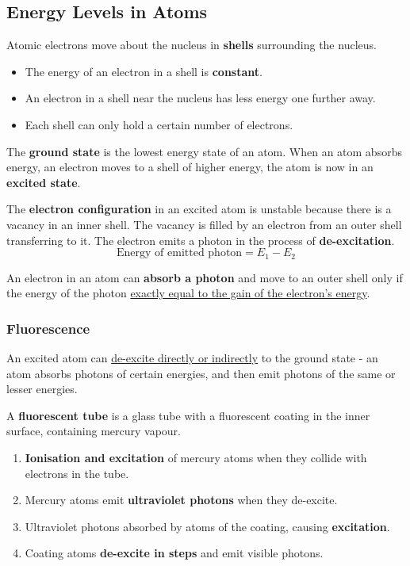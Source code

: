 \subsection{Energy Levels in Atoms}

Atomic electrons move about the nucleus in \textbf{shells} surrounding the nucleus.
\begin{itemize}
    \item The energy of an electron in a shell is \textbf{constant}.
    \item An electron in a shell near the nucleus has less energy one further away.
    \item Each shell can only hold a certain number of electrons.
\end{itemize}

The \textbf{ground state} is the lowest energy state of an atom. When an atom absorbs energy, an electron moves to a shell of higher energy, the atom is now in an \textbf{excited state}.

The \textbf{electron configuration} in an excited atom is unstable because there is a vacancy in an inner shell. The vacancy is filled by an electron from an outer shell transferring to it. The electron emits a photon in the process of \textbf{de-excitation}.
$$\text{Energy of emitted photon}=E_1-E_2$$

An electron in an atom can \textbf{absorb a photon} and move to an outer shell only if the energy of the photon \underline{exactly equal to the gain of the electron's energy}.

\subsubsection*{Fluorescence}

An excited atom can \underline{de-excite directly or indirectly} to the ground state - an atom absorbs photons of certain energies, and then emit photons of the same or lesser energies.

A \textbf{fluorescent tube} is a glass tube with a fluorescent coating in the inner surface, containing mercury vapour.
\begin{enumerate}
    \item \textbf{Ionisation and excitation} of mercury atoms when they collide with electrons in the tube.
    \item Mercury atoms emit \textbf{ultraviolet photons} when they de-excite.
    \item Ultraviolet photons absorbed by atoms of the coating, causing \textbf{excitation}.
    \item Coating atoms \textbf{de-excite in steps} and emit visible photons.
\end{enumerate}

